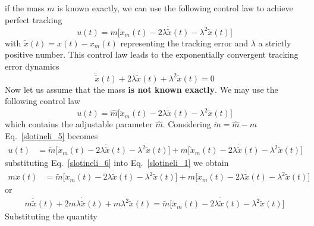\documentclass[12pt,a4paper,oneside]{book}
\begin{document}
\begin{onehalfspace}
\begin{example}
	if the mass $m$ is known exactly, we can use the following control law to achieve perfect tracking 
	\begin{equation}\label{slotineli_3}
		u(t)=m\Big[\ddot{x}_m(t)-2\lambda\dot{\tilde{x}}(t)-\lambda^2\tilde{x}(t)\Big]
	\end{equation} 
	with $\tilde{x}(t)=x(t)-x_m(t)$ representing the tracking error and $\lambda$ a strictly positive number. This control law leads to the exponentially convergent tracking error dynamics
	\begin{equation}\label{slotineli_4}
		\ddot{\tilde{x}}(t)+2\lambda\dot{\tilde{x}}(t)+\lambda^2\tilde{x}(t)=0
	\end{equation} 
	Now let us assume that the mass \textbf{is not known exactly}. We may use the following control law
	\begin{equation}\label{slotineli_5}
		u(t)=\hat{m}\Big[\ddot{x}_m(t)-2\lambda\dot{\tilde{x}}(t)-\lambda^2\tilde{x}(t)\Big]
	\end{equation} 
	which contains the adjustable parameter $\hat{m}$. Considering $\tilde{m} = \hat{m}-m$ Eq.~\ref{slotineli_5} becomes	
	\begin{equation}\label{slotineli_6}
		\begin{aligned}
			u(t) &= \tilde{m}\Big[\ddot{x}_m(t)-2\lambda\dot{\tilde{x}}(t)-\lambda^2\tilde{x}(t)\Big] + {m}\Big[\ddot{x}_m(t)-2\lambda\dot{\tilde{x}}(t)-\lambda^2\tilde{x}(t)\Big]
		\end{aligned}
	\end{equation} 
	substituting Eq.~\ref{slotineli_6} into Eq.~\ref{slotineli_1} we obtain
	\begin{equation}\label{slotineli_7}
		\begin{aligned}
			m\ddot{x}(t) &= \tilde{m}\Big[\ddot{x}_m(t)-2\lambda\dot{\tilde{x}}(t)-\lambda^2\tilde{x}(t)\Big] + {m}\Big[\ddot{x}_m(t)-2\lambda\dot{\tilde{x}}(t)-\lambda^2\tilde{x}(t)\Big]
		\end{aligned}
	\end{equation} 
	or 
	\begin{equation}\label{slotineli_8}
		\begin{aligned}
			m\ddot{\tilde{x}}(t) +2m\lambda\dot{\tilde{x}}(t)+m\lambda^2\tilde{x}(t) =  \tilde{m}\Big[\ddot{x}_m(t)-2\lambda\dot{\tilde{x}}(t)-\lambda^2\tilde{x}(t)\Big]
		\end{aligned}
	\end{equation} 
	Substituting the quantity 
	\begin{equation}\label{slotineli_9}
		\begin{aligned}

\end{aligned}
\end{equation}
\end{example}
\end{onehalfspace}
\end{document}
